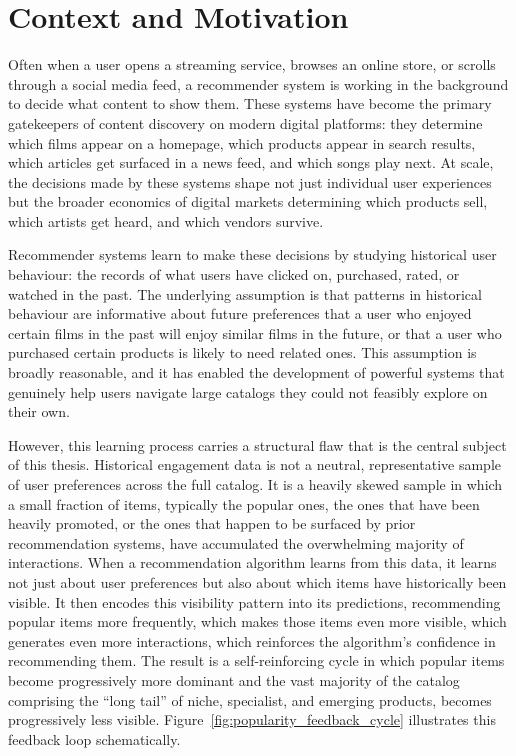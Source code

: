 \documentclass[11pt,a4paper]{report}
\begin{document}
\section{Context and Motivation}

Often when a user opens a streaming service, browses an online store, or scrolls through a social media feed, a recommender system is working in the background to decide what content to show them. These systems have become the primary gatekeepers of content discovery on modern digital platforms: they determine which films appear on a homepage, which products appear in search results, which articles get surfaced in a news feed, and which songs play next. At scale, the decisions made by these systems shape not just individual user experiences but the broader economics of digital markets determining which products sell, which artists get heard, and which vendors survive.

Recommender systems learn to make these decisions by studying historical user behaviour: the records of what users have clicked on, purchased, rated, or watched in the past. The underlying assumption is that patterns in historical behaviour are informative about future preferences that a user who enjoyed certain films in the past will enjoy similar films in the future, or that a user who purchased certain products is likely to need related ones. This assumption is broadly reasonable, and it has enabled the development of powerful systems that genuinely help users navigate large catalogs they could not feasibly explore on their own.

However, this learning process carries a structural flaw that is the central subject of this thesis. Historical engagement data is not a neutral, representative sample of user preferences across the full catalog. It is a heavily skewed sample in which a small fraction of items, typically the popular ones, the ones that have been heavily promoted, or the ones that happen to be surfaced by prior recommendation systems, have accumulated the overwhelming majority of interactions. When a recommendation algorithm learns from this data, it learns not just about user preferences but also about which items have historically been visible. It then encodes this visibility pattern into its predictions, recommending popular items more frequently, which makes those items even more visible, which generates even more interactions, which reinforces the algorithm's confidence in recommending them. The result is a self-reinforcing cycle in which popular items become progressively more dominant and the vast majority of the catalog comprising the ``long tail'' of niche, specialist, and emerging products, becomes progressively less visible. Figure~\ref{fig:popularity_feedback_cycle} illustrates this feedback loop schematically.
\end{document}
